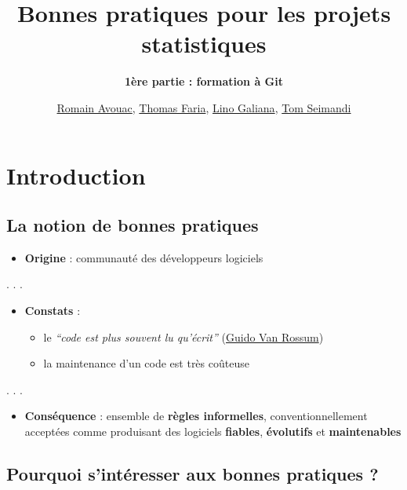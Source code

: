 \documentclass[
  letterpaper,
  DIV=11,
  numbers=noendperiod]{scrartcl}
\title{Bonnes pratiques pour les projets statistiques}
\subtitle{\textbf{{1ère partie : formation à Git}}}
\author{\href{https://github.com/avouacr}{Romain Avouac},
\href{https://github.com/ThomasFaria}{Thomas Faria},
\href{https://www.linogaliana.fr/}{Lino Galiana},
\href{https://github.com/tomseimandi/}{Tom Seimandi}}
\date{}
\providecommand{\tightlist}{%
  \setlength{\itemsep}{0pt}\setlength{\parskip}{0pt}}\usepackage{longtable,booktabs,array}
\begin{document}
\maketitle
\ifdefined\Shaded\renewenvironment{Shaded}{\begin{tcolorbox}[sharp corners, boxrule=0pt, borderline west={3pt}{0pt}{shadecolor}, breakable, interior hidden, enhanced, frame hidden]}{\end{tcolorbox}}\fi

\hypertarget{introduction}{%
\section{Introduction}\label{introduction}}

\hypertarget{la-notion-de-bonnes-pratiques}{%
\subsection{La notion de bonnes
pratiques}\label{la-notion-de-bonnes-pratiques}}

\begin{itemize}
\tightlist
\item
  {\textbf{Origine}} : communauté des développeurs logiciels
\end{itemize}

. . .

\begin{itemize}
\tightlist
\item
  {\textbf{Constats}} :

  \begin{itemize}
  \tightlist
  \item
    le {\emph{``code est plus souvent lu qu'écrit''}}
    (\href{https://fr.wikipedia.org/wiki/Guido_van_Rossum}{Guido Van
    Rossum})
  \item
    la maintenance d'un code est très coûteuse
  \end{itemize}
\end{itemize}

. . .

\begin{itemize}
\tightlist
\item
  {\textbf{Conséquence}} : ensemble de {\textbf{règles informelles}},
  conventionnellement acceptées comme produisant des logiciels
  {\textbf{fiables}}, {\textbf{évolutifs}} et {\textbf{maintenables}}
\end{itemize}

\hypertarget{pourquoi-sintuxe9resser-aux-bonnes-pratiques}{%
\subsection{Pourquoi s'intéresser aux bonnes pratiques
?}\label{pourquoi-sintuxe9resser-aux-bonnes-pratiques}}
\end{document}
